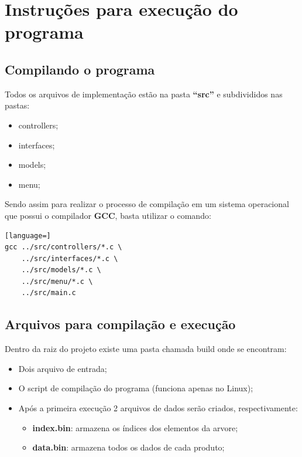 \documentclass[12pt, a4paper]{article}
\begin{document}
\tableofcontents
\listoffigures
\newpage

\section{Instruções para execução do programa}\label{Instruções para execução do programa}

\subsection{Compilando o programa}\label{Compilando o proograma}
Todos os arquivos de implementação estão na pasta \textbf{``src''} e subdivididos nas pastas:
\begin{itemize}
    \item controllers;
    \item interfaces;
    \item models;
    \item menu;
\end{itemize}
Sendo assim para realizar o processo de compilação em um sistema operacional que possui o compilador \textbf{GCC}, basta utilizar o comando:

\begin{lstlisting}[language=]
gcc ../src/controllers/*.c \
    ../src/interfaces/*.c \
    ../src/models/*.c \
    ../src/menu/*.c \
    ../src/main.c
\end{lstlisting}

\subsection{Arquivos para compilação e execução}\label{Arquivos para compilação e execução}
Dentro da raiz do projeto existe uma pasta chamada build onde se encontram:
\begin{itemize}
    \item Dois arquivo de entrada;
    \item O script de compilação do programa (funciona apenas no Linux);
    \item Após a primeira execução 2 arquivos de dados serão criados, respectivamente:
        \begin{itemize}
            \item \textbf{index.bin}: armazena os índices dos elementos da arvore;
        \item \textbf{data.bin}: armazena todos os dados de cada produto;
        \end{itemize}
\end{itemize}
\end{document}

